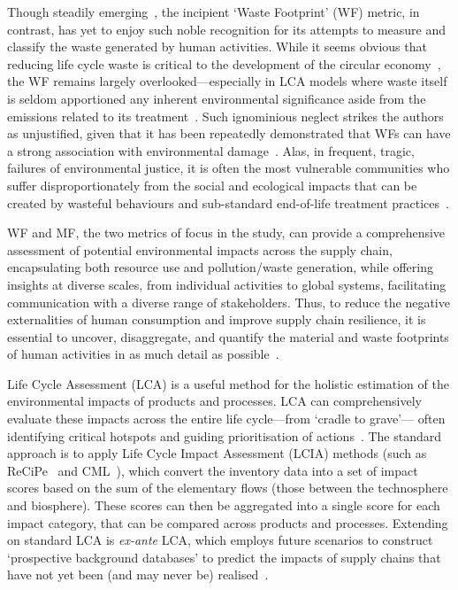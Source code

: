Though steadily emerging~\citep{laurenti2016wastefootprint,demirer2019wastefootprint,guillotreau2023wastefootprint}, the incipient `Waste Footprint' (WF) metric, in contrast, has yet to enjoy such noble recognition for its attempts to measure and classify the waste generated by human activities. While it seems obvious that reducing life cycle waste is critical to the development of the circular economy~\citep{towa2020wastefootprint,ellenmacarthur2015ce}, the WF remains largely overlooked---especially in LCA models where waste itself is seldom apportioned any inherent environmental significance aside from the emissions related to its treatment~\citep{laurenti2023wastefootprint}.
Such ignominious neglect strikes the authors as unjustified, given that it has been repeatedly demonstrated that WFs can have a strong association with environmental damage~\citep{laurenti2023wastefootprint,doka2024publications, ridoutt2010wasteimpacts,jaio2013wasteabsorbtionfootprint}. Alas, in frequent, tragic, failures of environmental justice, it is often the most vulnerable communities who suffer disproportionately from the social and ecological impacts that can be created by wasteful behaviours and sub-standard end-of-life treatment practices~\citep{pellow2023envjusticewaste,akese2018envjustice}.

WF and MF, the two metrics of focus in the study, can provide a comprehensive assessment of potential environmental impacts across the supply chain, encapsulating both resource use and pollution/waste generation, while offering insights at diverse scales, from individual activities to global systems, facilitating communication with a diverse range of stakeholders. Thus, to reduce the negative externalities of human consumption and improve supply chain resilience, it is essential to uncover, disaggregate, and quantify the material and waste footprints of human activities in as much detail as possible~\citep{bisinella2024wastelca, towa2020wastefootprint,berger2020mineralsinlca,sonderegger2020mineralsinlca}.


Life Cycle Assessment (LCA) is a useful method for the holistic estimation of the environmental impacts of products and processes. LCA can comprehensively evaluate these impacts across the entire life cycle---from `cradle to grave'--- often identifying critical hotspots and guiding prioritisation of actions~\citep{guinee2011lca}. The standard approach is to apply Life Cycle Impact Assessment (LCIA) methods (such as ReCiPe~\citep{huijbregts2016recipe} and CML~\citep{guinee2002cml}), which convert the inventory data into a set of impact scores based on the sum of the elementary flows (those between the technosphere and biosphere). These scores can then be aggregated into a single score for each impact category, that can be compared across products and processes. Extending on standard LCA is \textit{ex-ante} LCA, which employs future scenarios to construct `prospective background databases' to predict the impacts of supply chains that have not yet been (and may never be) realised~\citep{cucurachi2018exante,blanco2020exante}.

